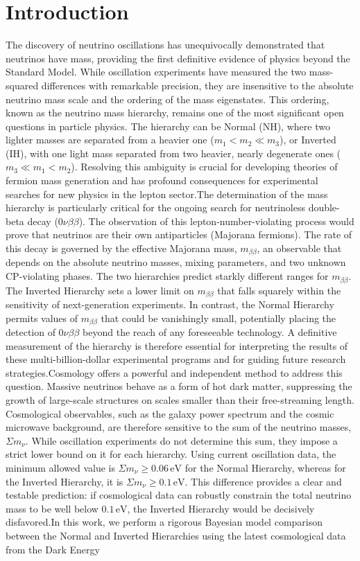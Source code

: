 \documentclass[]{article}
\begin{document}
\section{Introduction}
\label{sec:intro}
The discovery of neutrino oscillations has unequivocally demonstrated that neutrinos have mass, providing the first definitive evidence of physics beyond the Standard Model. While oscillation experiments have measured the two mass-squared differences with remarkable precision, they are insensitive to the absolute neutrino mass scale and the ordering of the mass eigenstates. This ordering, known as the neutrino mass hierarchy, remains one of the most significant open questions in particle physics. The hierarchy can be Normal (NH), where two lighter masses are separated from a heavier one ($m_1 < m_2 \ll m_3$), or Inverted (IH), with one light mass separated from two heavier, nearly degenerate ones ($m_3 \ll m_1 < m_2$). Resolving this ambiguity is crucial for developing theories of fermion mass generation and has profound consequences for experimental searches for new physics in the lepton sector.The determination of the mass hierarchy is particularly critical for the ongoing search for neutrinoless double-beta decay ($0\nu\beta\beta$). The observation of this lepton-number-violating process would prove that neutrinos are their own antiparticles (Majorana fermions). The rate of this decay is governed by the effective Majorana mass, $m_{\beta\beta}$, an observable that depends on the absolute neutrino masses, mixing parameters, and two unknown CP-violating phases. The two hierarchies predict starkly different ranges for $m_{\beta\beta}$. The Inverted Hierarchy sets a lower limit on $m_{\beta\beta}$ that falls squarely within the sensitivity of next-generation experiments. In contrast, the Normal Hierarchy permits values of $m_{\beta\beta}$ that could be vanishingly small, potentially placing the detection of $0\nu\beta\beta$ beyond the reach of any foreseeable technology. A definitive measurement of the hierarchy is therefore essential for interpreting the results of these multi-billion-dollar experimental programs and for guiding future research strategies.Cosmology offers a powerful and independent method to address this question. Massive neutrinos behave as a form of hot dark matter, suppressing the growth of large-scale structures on scales smaller than their free-streaming length. Cosmological observables, such as the galaxy power spectrum and the cosmic microwave background, are therefore sensitive to the sum of the neutrino masses, $\Sigma m_\nu$. While oscillation experiments do not determine this sum, they impose a strict lower bound on it for each hierarchy. Using current oscillation data, the minimum allowed value is $\Sigma m_\nu \ge 0.06\,\text{eV}$ for the Normal Hierarchy, whereas for the Inverted Hierarchy, it is $\Sigma m_\nu \ge 0.1\,\text{eV}$. This difference provides a clear and testable prediction: if cosmological data can robustly constrain the total neutrino mass to be well below $0.1\,\text{eV}$, the Inverted Hierarchy would be decisively disfavored.In this work, we perform a rigorous Bayesian model comparison between the Normal and Inverted Hierarchies using the latest cosmological data from the Dark Energy 
\end{document}

